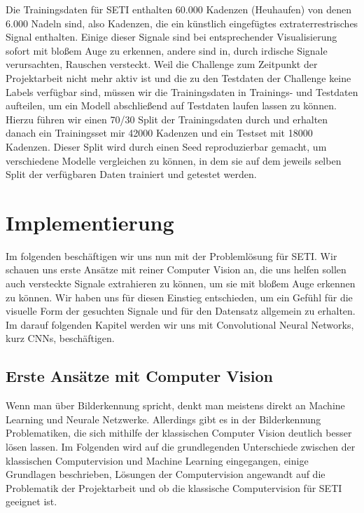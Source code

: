 \documentclass[12pt, a4paper]{article}
\begin{document}
Die Trainingsdaten für SETI enthalten 60.000 Kadenzen (Heuhaufen) von denen 6.000 Nadeln sind, also Kadenzen, die ein künstlich eingefügtes extraterrestrisches Signal enthalten. Einige dieser Signale sind bei entsprechender Visualisierung sofort mit bloßem Auge zu erkennen, andere sind in, durch irdische Signale verursachten, Rauschen versteckt. Weil die Challenge zum Zeitpunkt der Projektarbeit nicht mehr aktiv ist und die zu den Testdaten der Challenge keine Labels verfügbar sind, müssen wir die Trainingsdaten in Trainings- und Testdaten aufteilen, um ein Modell abschließend auf Testdaten laufen lassen zu können. Hierzu führen wir einen 70/30 Split der Trainingsdaten durch und erhalten danach ein Trainingsset mir 42000 Kadenzen und ein Testset mit 18000 Kadenzen. Dieser Split wird durch einen Seed reproduzierbar gemacht, um verschiedene Modelle vergleichen zu können, in dem sie auf dem jeweils selben Split der verfügbaren Daten trainiert und getestet werden.


\section{Implementierung}
Im folgenden beschäftigen wir uns nun mit der Problemlösung für SETI. Wir schauen uns erste Ansätze mit reiner Computer Vision an, die uns helfen sollen auch versteckte Signale extrahieren zu können, um sie mit bloßem Auge erkennen zu können. Wir haben uns für diesen Einstieg entschieden, um ein Gefühl für die visuelle Form der gesuchten Signale und für den Datensatz allgemein zu erhalten. Im darauf folgenden Kapitel werden wir uns mit Convolutional Neural Networks, kurz CNNs, beschäftigen.

\subsection{Erste Ansätze mit Computer Vision}
Wenn man über Bilderkennung spricht, denkt man meistens direkt an Machine Learning und Neurale Netzwerke. Allerdings gibt es in der Bilderkennung Problematiken, die sich mithilfe der klassischen Computer Vision deutlich besser lösen lassen. Im Folgenden wird auf die grundlegenden Unterschiede zwischen der klassischen Computervision und Machine Learning eingegangen, einige Grundlagen beschrieben, Lösungen der Computervision angewandt auf die Problematik der Projektarbeit und ob die klassische Computervision für SETI geeignet ist.
\end{document}
